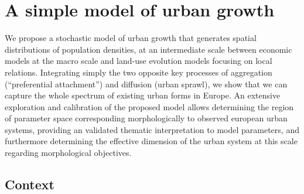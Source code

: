 
\newpage



\section{A simple model of urban growth}



We propose a stochastic model of urban growth that generates spatial distributions of population densities, at an intermediate scale between economic models at the macro scale and land-use evolution models focusing on local relations. Integrating simply the two opposite key processes of aggregation (``preferential attachment'') and diffusion (urban sprawl), we show that we can capture the whole spectrum of existing urban forms in Europe. An extensive exploration and calibration of the proposed model allows determining the region of parameter space corresponding morphologically to observed european urban systems, providing an validated thematic interpretation to model parameters, and furthermore determining the effective dimension of the urban system at this scale regarding morphological objectives.




\subsection{Context}






